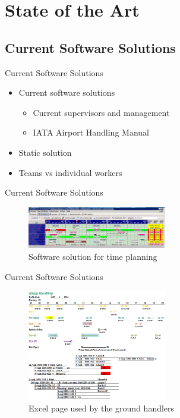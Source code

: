 \section{State of the Art}

\subsection{Current Software Solutions}
\begin{frame}{Current Software Solutions}
    \begin{itemize}
        \item{Current software solutions}
        \begin{itemize}
            \item{Current supervisors and management}
            \item{IATA Airport Handling Manual}
        \end{itemize}
        \item{Static solution}
        \item{Teams vs individual workers}
    \end{itemize}
\end{frame}

\begin{frame}{Current Software Solutions}
        \begin{figure}[H]
            \centering
            \includegraphics[width=230px]{Grafik/TimePlan}
            \caption{\footnotesize Software solution for time planning}
        \end{figure}
\end{frame}

\begin{frame}{Current Software Solutions}
        \begin{figure}[H]
            \centering
            \includegraphics[width=230px]{Grafik/excelark}
            \caption{\footnotesize Excel page used by the ground handlers}
        \end{figure}
\end{frame}

